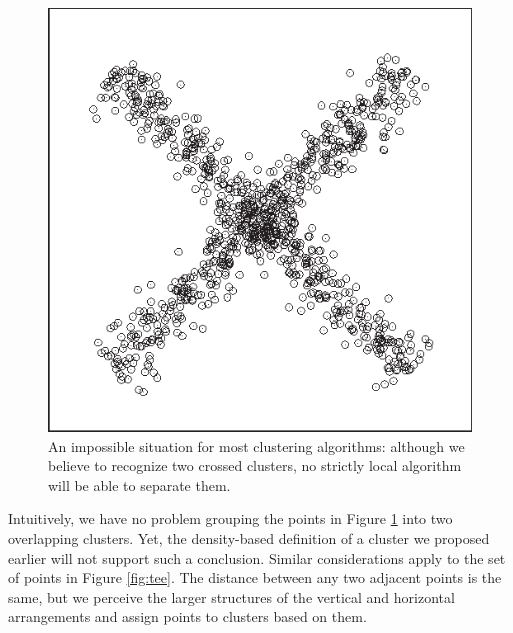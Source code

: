 \begin{figure}
  \centerline{\includegraphics{img/crossedclouds}}
  \caption{An impossible situation for most clustering algorithms:
    although we believe to recognize two crossed clusters, no strictly
    local algorithm will be able to separate them.}
  \label{fig:crossedclouds}
\end{figure}


Intuitively, we have no problem grouping the points in Figure
\ref{fig:crossedclouds} into two overlapping clusters. Yet, the
density-based definition of a cluster we proposed earlier will not
support such a conclusion.  Similar considerations apply to the set of
points in Figure \ref{fig:tee}. The distance between any two adjacent 
points\vadjust{\pagebreak} is the same, but we perceive the larger structures of the
vertical and horizontal arrangements and assign points to clusters
based on them.


